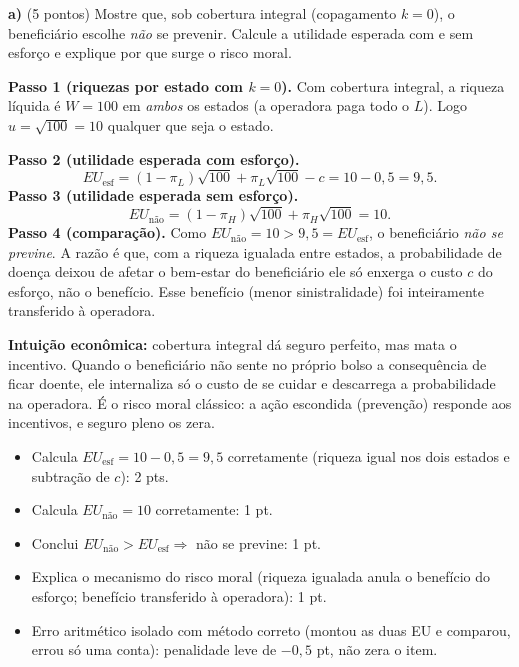 \textbf{a)} (5 pontos) Mostre que, sob cobertura integral (copagamento $k=0$), o benefici\'ario escolhe \emph{n\~ao} se prevenir. Calcule a utilidade esperada com e sem esfor\c{c}o e explique por que surge o risco moral.
\resolucaobox{7.6cm}
\begin{solucao}
\textbf{Passo 1 (riquezas por estado com $k=0$).} Com cobertura integral, a riqueza l\'iquida \'e $W=100$ em \emph{ambos} os estados (a operadora paga todo o $L$). Logo $u=\sqrt{100}=10$ qualquer que seja o estado.

\textbf{Passo 2 (utilidade esperada com esfor\c{c}o).}
\[
EU_{\text{esf}} = (1-\pi_L)\sqrt{100} + \pi_L\sqrt{100} - c = 10 - 0{,}5 = 9{,}5.
\]
\textbf{Passo 3 (utilidade esperada sem esfor\c{c}o).}
\[
EU_{\text{n\~ao}} = (1-\pi_H)\sqrt{100} + \pi_H\sqrt{100} = 10.
\]
\textbf{Passo 4 (compara\c{c}\~ao).} Como $EU_{\text{n\~ao}} = 10 > 9{,}5 = EU_{\text{esf}}$, o benefici\'ario \emph{n\~ao se previne}. A raz\~ao \'e que, com a riqueza igualada entre estados, a probabilidade de doen\c{c}a deixou de afetar o bem-estar do benefici\'ario \textemdash{} ele s\'o enxerga o custo $c$ do esfor\c{c}o, n\~ao o benef\'icio. Esse benef\'icio (menor sinistralidade) foi inteiramente transferido \`a operadora.

\textbf{Intui\c{c}\~ao econ\^omica:} cobertura integral d\'a seguro perfeito, mas mata o incentivo. Quando o benefici\'ario n\~ao sente no pr\'oprio bolso a consequ\^encia de ficar doente, ele internaliza s\'o o custo de se cuidar e descarrega a probabilidade na operadora. \'E o risco moral cl\'assico: a a\c{c}\~ao escondida (preven\c{c}\~ao) responde aos incentivos, e seguro pleno os zera.
\rubricalabel
\begin{itemize}
\item Calcula $EU_{\text{esf}} = 10 - 0{,}5 = 9{,}5$ corretamente (riqueza igual nos dois estados e subtra\c{c}\~ao de $c$): 2 pts.
\item Calcula $EU_{\text{n\~ao}} = 10$ corretamente: 1 pt.
\item Conclui $EU_{\text{n\~ao}} > EU_{\text{esf}} \Rightarrow$ n\~ao se previne: 1 pt.
\item Explica o mecanismo do risco moral (riqueza igualada anula o benef\'icio do esfor\c{c}o; benef\'icio transferido \`a operadora): 1 pt.
\item Erro aritm\'etico isolado com m\'etodo correto (montou as duas EU e comparou, errou s\'o uma conta): penalidade leve de $-0{,}5$ pt, n\~ao zera o item.
\end{itemize}
\end{solucao}

